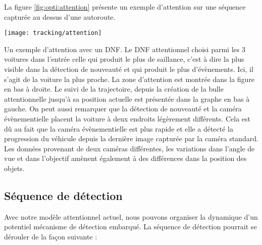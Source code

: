 	La figure \ref{fig:opti:attention} présente un exemple d'attention sur une séquence capturée au dessus d'une autoroute.

	\begin{figureth}
		\begin{subfigureth}{\textwidth}
			\texttt{[image: tracking/attention]}
		\end{subfigureth}
		\caption[Exemple d'Attention avec DNF]{Un exemple d'attention avec un DNF. Le DNF attentionnel choisi parmi les 3 voitures dans l'entrée celle qui produit le plus de saillance, c'est à dire la plus visible dans la détection de nouveauté et qui produit le plus d'évènements. Ici, il s'agit de la voiture la plus proche. La zone d'attention est montrée dans la figure en bas à droite. Le suivi de la trajectoire, depuis la création de la bulle attentionnelle jusqu'à sa position actuelle est présentée dans la graphe en bas à gauche. On peut aussi remarquer que la détection de nouveauté et la caméra évènementielle placent la voiture à deux endroits légèrement différents. Cela est dû au fait que la caméra évènementielle est plus rapide et elle a détecté la progression du véhicule depuis la dernière image capturée par la caméra standard. Les données provenant de deux caméras différentes, les variations dans l'angle de vue et dans l'objectif amènent également à des différences dans la position des objets.}\label{fig:opti:attention}
	\end{figureth}

	\subsection{Séquence de détection}

	Avec notre modèle attentionnel actuel, nous pouvons organiser la dynamique d'un potentiel mécanisme de détection embarqué. La séquence de détection pourrait se dérouler de la façon suivante : 

